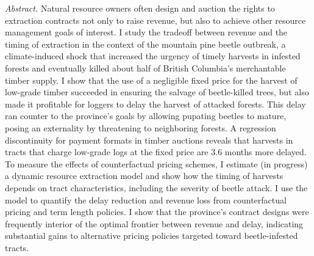 \documentclass[11pt,letterpaper]{article}
\begin{document}
\textit{Abstract. }
Natural resource owners often design and auction the rights to extraction contracts not only to raise revenue, but also to achieve other resource management goals of interest.
I study the tradeoff between revenue and the timing of extraction in the context of the mountain pine beetle outbreak, a climate-induced shock that increased the urgency of timely harvests in infested forests and eventually killed about half of British Columbia's merchantable timber supply. 
I show that the use of a negligible fixed price for the harvest of low-grade timber succeeded in ensuring the salvage of beetle-killed trees, but also made it profitable for loggers to delay the harvest of attacked forests. 
This delay ran counter to the province's goals by allowing pupating beetles to mature, posing an externality by threatening to neighboring forests. 
A regression discontinuity for payment formats in timber auctions reveals that harvests in tracts that charge low-grade logs at the fixed price are 3.6 months more delayed. 
To measure the effects of counterfactual pricing schemes, I estimate (in progress) a dynamic resource extraction model and show how the timing of harvests depends on tract characteristics, including the severity of beetle attack.
I use the model to quantify the delay reduction and revenue loss from counterfactual pricing and term length policies.
I show that the province's contract designs were frequently interior of the optimal frontier between revenue and delay, indicating substantial gains to alternative pricing policies targeted toward beetle-infested tracts.
\end{document}
